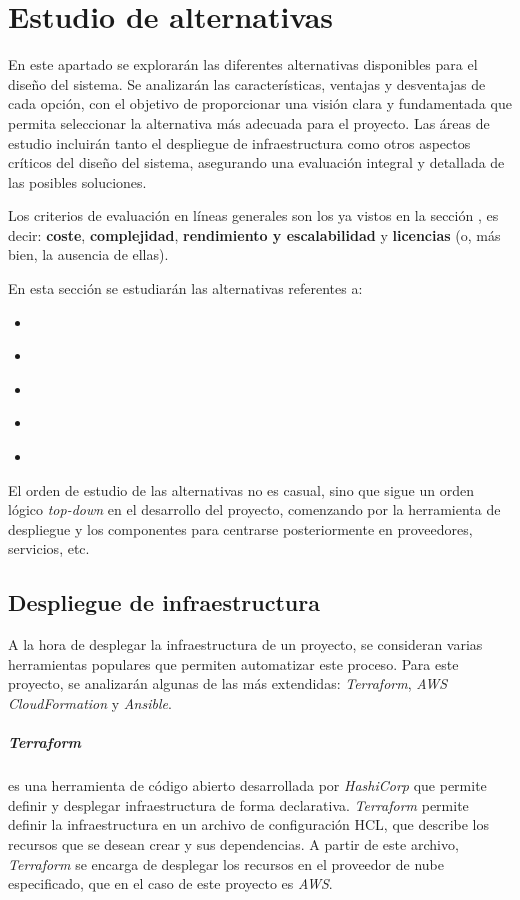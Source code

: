 \section{Estudio de alternativas}\label{sec:estudio}
En este apartado se explorarán las diferentes alternativas disponibles para el
diseño del sistema. Se analizarán las características, ventajas y desventajas de
cada opción, con el objetivo de proporcionar una visión clara y fundamentada que
permita seleccionar la alternativa más adecuada para el proyecto. Las áreas de
estudio incluirán tanto el despliegue de infraestructura como otros aspectos
críticos del diseño del sistema, asegurando una evaluación integral y detallada
de las posibles soluciones.

Los criterios de evaluación en líneas generales son los ya vistos en la sección
, es decir: \textbf{coste}, \textbf{complejidad},
\textbf{rendimiento y escalabilidad} y \textbf{licencias} (o, más bien, la
ausencia de ellas).

En esta sección se estudiarán las alternativas referentes a:

\begin{itemize}
	\item \textbf{}
	\item \textbf{}
	\item \textbf{}
	\item \textbf{}
	\item \textbf{}
\end{itemize}

El orden de estudio de las alternativas no es casual, sino que sigue un orden
lógico \textit{top-down} en el desarrollo del proyecto, comenzando por la
herramienta de despliegue y los componentes para centrarse posteriormente en
proveedores, servicios, etc.


\newpage{}
\subsection{Despliegue de infraestructura}\label{subsec:alt_despliegue}
A la hora de desplegar la infraestructura de un proyecto, se consideran varias
herramientas populares que permiten automatizar este proceso. Para este
proyecto, se analizarán algunas de las más extendidas: \textit{Terraform},
\textit{AWS CloudFormation} y \textit{Ansible}.


\subparagraph{Terraform} es una herramienta de código abierto desarrollada por
\textit{HashiCorp} que permite definir y desplegar infraestructura de forma
declarativa. \textit{Terraform} permite definir la infraestructura en un archivo
de configuración HCL, que describe los recursos que se desean crear y sus
dependencias. A partir de este archivo, \textit{Terraform} se encarga de
desplegar los recursos en el proveedor de nube especificado, que en el caso de
este proyecto es \textit{AWS}.

